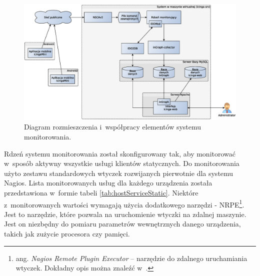 \begin{figure}[ht]
  \caption{Diagram rozmieszczenia i~współpracy elementów systemu
    monitorowania.}
 \label{fig:deployment}
\includegraphics[width=1\textwidth]{img/deployment}
\end{figure}

Rdzeń systemu monitorowania został skonfigurowany tak, aby monitorować
w~sposób aktywny wszystkie usługi klientów statycznych. Do
monitorowania użyto zestawu standardowych wtyczek rozwijanych
pierwotnie dla systemu Nagios. Lista monitorowanych usług dla każdego
urządzenia została przedstawiona w~formie tabeli
\ref{tab:hostServiceStatic}. Niektóre z~monitorowanych wartości
wymagają użycia dodatkowego narzędzi - NRPE\footnote{ang. {\em Nagios
    Remote Plugin Executor} -- narzędzie do zdalnego uruchamiania
  wtyczek. Dokładny opis można znaleźć w~\cite{www:NRPE}.}. Jest to
narzędzie, które pozwala na uruchomienie wtyczki na zdalnej
maszynie. Jest on niezbędny do pomiaru parametrów wewnętrznych danego
urządzenia, takich jak zużycie procesora czy pamięci.

